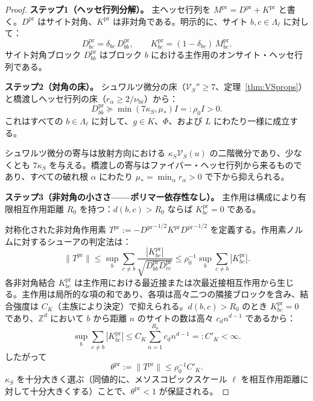 \documentclass[12pt]{article}
\theoremstyle{plain}
\theoremstyle{definition}
\numberwithin{equation}{section}
\newcommand{\Z}{\mathbb{Z}}
\newcommand{\pr}{\mathrm{pr}}
\newcommand{\br}{\mathrm{br}}
\begin{document}
\begin{proof}
\textbf{ステップ1（ヘッセ行列分解）。}
主ヘッセ行列を $M^{\pr}=D^{\pr}+K^{\pr}$ と書く。$D^{\pr}$ はサイト対角、$K^{\pr}$ は非対角である。明示的に、サイト $b,c\in\Lambda_\ell$ に対して：
\begin{equation}
D^{\pr}_{bc} = \delta_{bc}\,D^{\pr}_{bb},\qquad K^{\pr}_{bc} = (1-\delta_{bc})\,M^{\pr}_{bc}.
\end{equation}
サイト対角ブロック $D^{\pr}_{bb}$ はブロック $b$ における主作用のオンサイト・ヘッセ行列である。

\textbf{ステップ2（対角の床）。}
シュワルツ微分の床（$\mathcal{V}_S''\geq 7$、定理~\ref{thm:VSprops}）と橋渡しヘッセ行列の床（$r_\alpha\geq 2/\nu_{\br}$）から：
\begin{equation}
D^{\pr}_{bb} \succeq \min(7\kappa_S,\mu_*) I =: \rho_0 I > 0.
\end{equation}
これはすべての $b\in\Lambda_\ell$ に対して、$g\in K$、$\Phi$、および $L$ にわたり一様に成立する。

シュワルツ微分の寄与は放射方向における $\kappa_S\mathcal{V}_S(u)$ の二階微分であり、少なくとも $7\kappa_S$ を与える。橋渡しの寄与はファイバー・ヘッセ行列から来るものであり、すべての破れ根 $\alpha$ にわたり $\mu_*=\min_\alpha r_\alpha>0$ で下から抑えられる。

\textbf{ステップ3（非対角の小ささ——ポリマー依存性なし）。}
主作用は構成により有限相互作用距離 $R_0$ を持つ：$d(b,c)>R_0$ ならば $K^{\pr}_{bc}=0$ である。

対称化された非対角作用素 $T^{\pr}:=-{D^{\pr}}^{-1/2}K^{\pr}{D^{\pr}}^{-1/2}$ を定義する。作用素ノルムに対するシューアの判定法は：
\begin{equation}
\|T^{\pr}\| \leq \sup_b\sum_{c\neq b}\frac{|K^{\pr}_{bc}|}{\sqrt{D^{\pr}_{bb}D^{\pr}_{cc}}}
\leq \rho_0^{-1}\sup_b\sum_{c\neq b}|K^{\pr}_{bc}|.
\end{equation}
各非対角結合 $K^{\pr}_{bc}$ は主作用における最近接または次最近接相互作用から生じる。主作用は局所的な項の和であり、各項は高々二つの隣接ブロックを含み、結合強度は $C_K$（主族により決定）で抑えられる。$d(b,c)>R_0$ のとき $K^{\pr}_{bc}=0$ であり、$\Z^d$ において $b$ から距離 $n$ のサイトの数は高々 $c_d n^{d-1}$ であるから：
\begin{equation}
\sup_b\sum_{c\neq b}|K^{\pr}_{bc}| \leq C_K\sum_{n=1}^{R_0}c_d n^{d-1} =: C'_K < \infty.
\end{equation}
したがって
\begin{equation}
\theta^{\pr} := \|T^{\pr}\| \leq \rho_0^{-1}C'_K.
\end{equation}
$\kappa_S$ を十分大きく選ぶ（同値的に、メソスコピックスケール $\ell$ を相互作用距離に対して十分大きくする）ことで、$\theta^{\pr}<1$ が保証される。


\end{proof}
\end{document}
